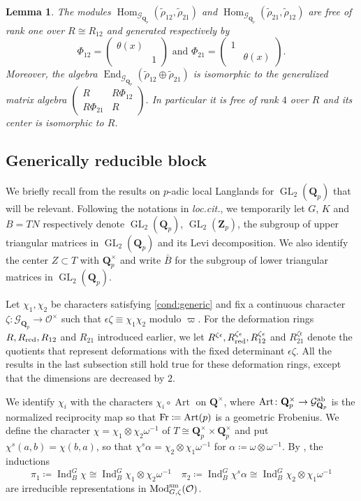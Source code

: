 \documentclass[leqno]{amsart}
\newtheorem{lem}[thm]{Lemma}
\theoremstyle{definition}
\theoremstyle{remark}
\newcommand{\smat}[1]{\left(\begin{smallmatrix} #1 \end{smallmatrix}\right)}
\newcommand{\oo}{\mathcal{O}}
\newcommand{\Q}{{\mathbf{Q}}}
\newcommand{\Qp}{\mathbf{Q}_p}
\newcommand{\Zp}{\mathbf{Z}_p}
\DeclareMathOperator{\End}{End}
\DeclareMathOperator{\Hom}{Hom}
\DeclareMathOperator{\Ind}{Ind}
\DeclareMathOperator{\GL}{GL}
\DeclareMathOperator{\Art}{Art}
\newcommand{\Fr}{\textnormal{Fr}} %
\DeclareMathOperator{\Mod}{\textnormal{Mod}}
\newcommand{\Gp}{\mathcal{G}_{\Qp}} %
\newcommand{\sm}{\textnormal{sm}}
\newcommand{\red}{\textnormal{red}}
\begin{document}
\begin{lem}\cite[Prop B.26]{pask}
\label{lem:B26}
The modules
$\Hom_{\Gp}(\tilde{\rho}_{12}, \tilde{\rho}_{21})$ and
$\Hom_{\Gp}(\tilde{\rho}_{21}, \tilde{\rho}_{12})$
are free of rank one over $R\cong R_{12}$ and
generated respectively by
\begin{equation}\label{eq:Phi_ij}
	\Phi_{12}=\smat{\theta(x)&\\&1} \text{ and }
	\Phi_{21}=\smat{1&\\&\theta(x)}.
\end{equation}
Moreover, the algebra
$\End_{\Gp}(\tilde{\rho}_{12}\oplus \tilde{\rho}_{21})$
is isomorphic to the generalized matrix algebra
$\smat{R& R\Phi_{12}\\ R\Phi_{21}& R}$.
In particular it is free of rank $4$ over $R$ and
its center is isomorphic to $R$.
\end{lem}

\subsection{Generically reducible block}

We briefly recall from \cite{pask} the results on
$p$-adic local Langlands for $\GL_2(\Qp)$ 
that will be relevant.
Following the notations in \textit{loc.cit.},
we temporarily let $G$, $K$ and $B=TN$ respectively
denote $\GL_2(\Qp)$, $\GL_2(\Zp)$,
the subgroup of upper triangular matrices in $\GL_2(\Qp)$
and its Levi decomposition.
We also identify the center $Z\subset T$ with $\Qp^\times$
and write $\bar{B}$ for
the subgroup of lower triangular matrices in $\GL_2(\Qp)$.


Let $\chi_1,\chi_2$ be characters satisfying
\eqref{cond:generic} and fix a continuous character 
$\zeta\colon \Gp\to \oo^\times$
such that $\epsilon\zeta\equiv \chi_1\chi_2$ 
modulo $\varpi$.
For the deformation rings
$R, R_{\red}, R_{12}$ and $R_{21}$
introduced earlier, we let 
$R^{\zeta\epsilon}, R^{\zeta\epsilon}_{\red}, 
R^{\zeta\epsilon}_{12}$ and $R^{\zeta\epsilon}_{21}$
denote the quotients that represent
deformations with the
fixed determinant $\epsilon\zeta$.
All the results in the last subsection
still hold true for these deformation rings,
except that the dimensions are decreased by $2$.

We identify $\chi_i$ with the characters
$\chi_i\circ \Art$ on $\Q^\times$,
where $\Art\colon \Qp^\times\to \Gp^{\textnormal{ab}}$
is the normalized reciprocity map
so that $\Fr\coloneqq \Art(p)$
is a geometric Frobenius.
We define the character
$\chi=\chi_1\otimes\chi_2\omega^{-1}$
of $T\cong \Qp^\times\times\Qp^\times$
and put $\chi^s(a,b)=\chi(b,a)$, so that 
$\chi^s\alpha=\chi_2\otimes \chi_1\omega^{-1}$
for $\alpha\coloneqq \omega\otimes\omega^{-1}$.
By \cite[Thm 30]{barthel},
the inductions
\[
\pi_1\coloneqq \Ind_{B}^G\chi\cong
\Ind_{B}^G\chi_1\otimes\chi_2\omega^{-1}\quad
\pi_2\coloneqq \Ind_{B}^G\chi^s\alpha\cong 
\Ind_{B}^G\chi_2\otimes\chi_1\omega^{-1} 
\]
are irreducible representations
in $\Mod^{\sm}_{G,\zeta}(\oo)$.
\end{document}
